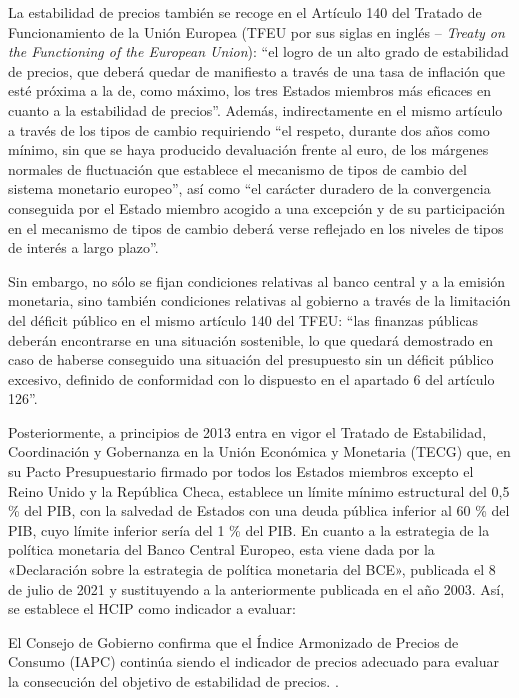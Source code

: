 \documentclass[titlepage, 12pt]{article}
\begin{document}
La estabilidad de precios también se recoge en el Artículo 140 del Tratado de Funcionamiento de la Unión Europea (TFEU por sus siglas en inglés – \textit{Treaty on the Functioning of the European Union}): \enquote{el logro de un alto grado de estabilidad de precios, que deberá quedar de manifiesto a través de una tasa de inflación que esté próxima a la de, como máximo, los tres Estados miembros más eficaces en cuanto a la estabilidad de precios}. Además, indirectamente en el mismo artículo a través de los tipos de cambio requiriendo \enquote{el respeto, durante dos años como mínimo, sin que se haya producido devaluación frente al euro, de los márgenes normales de fluctuación que establece el mecanismo de tipos de cambio del sistema monetario europeo}, así como \enquote{el carácter duradero de la convergencia conseguida por el Estado miembro acogido a una excepción y de su participación en el mecanismo de tipos de cambio deberá verse reflejado en los niveles de tipos de interés a largo plazo}.

Sin embargo, no sólo se fijan condiciones relativas al banco central y a la emisión monetaria, sino también condiciones relativas al gobierno a través de la limitación del déficit público en el mismo artículo 140 del TFEU: \enquote{las finanzas públicas deberán encontrarse en una situación sostenible, lo que quedará demostrado en caso de haberse conseguido una situación del presupuesto sin un déficit público excesivo, definido de conformidad con lo dispuesto en el apartado 6 del artículo 126}.

Posteriormente, a principios de 2013 entra en vigor el Tratado de Estabilidad, Coordinación y Gobernanza en la Unión Económica y Monetaria (TECG) que, en su Pacto Presupuestario firmado por todos los Estados miembros excepto el Reino Unido y la República Checa, establece un límite mínimo estructural del 0,5 \% del PIB, con la salvedad de Estados con una deuda pública inferior al 60 \% del PIB, cuyo límite inferior sería del 1 \% del PIB.
En cuanto a la estrategia de la política monetaria del Banco Central Europeo, esta viene dada por la «Declaración sobre la estrategia de política monetaria del BCE», publicada el 8 de julio de 2021 y sustituyendo a la anteriormente publicada en el año 2003. Así, se establece el HCIP como indicador a evaluar:

\begin{displayquote}
    El Consejo de Gobierno confirma que el Índice Armonizado de Precios de Consumo (IAPC) continúa siendo el indicador de precios adecuado para evaluar la consecución del objetivo de estabilidad de precios. \autocite{ecb2021}.
\end{displayquote}
\end{document}

